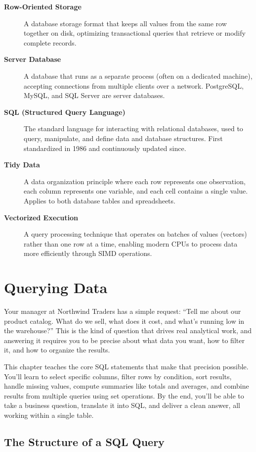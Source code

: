 \documentclass[
  letterpaper,
  DIV=11,
  numbers=noendperiod]{scrreprt}
\begin{document}
\begin{description}
\item[\textbf{Row-Oriented Storage}]
A database storage format that keeps all values from the same row
together on disk, optimizing transactional queries that retrieve or
modify complete records.
\item[\textbf{Server Database}]
A database that runs as a separate process (often on a dedicated
machine), accepting connections from multiple clients over a network.
PostgreSQL, MySQL, and SQL Server are server databases.
\item[\textbf{SQL (Structured Query Language)}]
The standard language for interacting with relational databases, used to
query, manipulate, and define data and database structures. First
standardized in 1986 and continuously updated since.
\item[\textbf{Tidy Data}]
A data organization principle where each row represents one observation,
each column represents one variable, and each cell contains a single
value. Applies to both database tables and spreadsheets.
\item[\textbf{Vectorized Execution}]
A query processing technique that operates on batches of values
(vectors) rather than one row at a time, enabling modern CPUs to process
data more efficiently through SIMD operations.
\end{description}

\chapter{Querying Data}\label{querying-data}

Your manager at Northwind Traders has a simple request: ``Tell me about
our product catalog. What do we sell, what does it cost, and what's
running low in the warehouse?'' This is the kind of question that drives
real analytical work, and answering it requires you to be precise about
what data you want, how to filter it, and how to organize the results.

This chapter teaches the core SQL statements that make that precision
possible. You'll learn to select specific columns, filter rows by
condition, sort results, handle missing values, compute summaries like
totals and averages, and combine results from multiple queries using set
operations. By the end, you'll be able to take a business question,
translate it into SQL, and deliver a clean answer, all working within a
single table.

\section{The Structure of a SQL
Query}\label{the-structure-of-a-sql-query}
\end{document}
